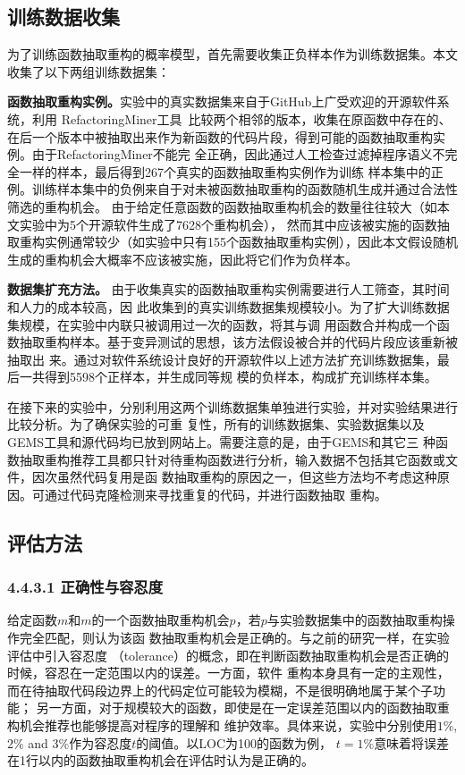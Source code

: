 \subsection{训练数据收集}
为了训练函数抽取重构的概率模型，首先需要收集正负样本作为训练数据集。本文收集了以下两组训练数据集：

\textbf{函数抽取重构实例。}实验中的真实数据集来自于GitHub上广受欢迎的开源软件系统，利用
RefactoringMiner工具~\cite{tsantalis2013multidimensional}比较两个相邻的版本，收集在原函数中存在的、
在后一个版本中被抽取出来作为新函数的代码片段，得到可能的函数抽取重构实例。由于RefactoringMiner不能完
全正确，因此通过人工检查过滤掉程序语义不完全一样的样本，最后得到267个真实的函数抽取重构实例作为训练
样本集中的正例。训练样本集中的负例来自于对未被函数抽取重构的函数随机生成并通过合法性筛选的重构机会。
由于给定任意函数的函数抽取重构机会的数量往往较大（如本文实验中为5个开源软件生成了7628个重构机会），
然而其中应该被实施的函数抽取重构实例通常较少（如实验中只有155个函数抽取重构实例），因此本文假设随机
生成的重构机会大概率不应该被实施，因此将它们作为负样本。

\textbf{数据集扩充方法。} 由于收集真实的函数抽取重构实例需要进行人工筛查，其时间和人力的成本较高，因
此收集到的真实训练数据集规模较小。为了扩大训练数据集规模，在实验中内联只被调用过一次的函数，将其与调
用函数合并构成一个函数抽取重构样本。基于变异测试的思想，该方法假设被合并的代码片段应该重新被抽取出
来。通过对软件系统设计良好的开源软件以上述方法扩充训练数据集，最后一共得到5598个正样本，并生成同等规
模的负样本，构成扩充训练样本集。
  
在接下来的实验中，分别利用这两个训练数据集单独进行实验，并对实验结果进行比较分析。为了确保实验的可重
复性，所有的训练数据集、实验数据集以及GEMS工具和源代码均已放到网站上。需要注意的是，由于GEMS和其它三
种函数抽取重构推荐工具都只针对待重构函数进行分析，输入数据不包括其它函数或文件，因次虽然代码复用是函
数抽取重构的原因之一，但这些方法均不考虑这种原因。可通过代码克隆检测来寻找重复的代码，并进行函数抽取
重构。

\subsection{评估方法}
\subsubsection{4.4.3.1 正确性与容忍度}\label{tol}
给定函数$m$和$m$的一个函数抽取重构机会$p$，若$p$与实验数据集中的函数抽取重构操作完全匹配，则认为该函
数抽取重构机会是正确的。与之前的研究一样\cite{charalampidou2016identifying}，在实验评估中引入容忍度
（tolerance）的概念，即在判断函数抽取重构机会是否正确的时候，容忍在一定范围以内的误差。一方面，软件
重构本身具有一定的主观性，而在待抽取代码段边界上的代码定位可能较为模糊，不是很明确地属于某个子功能；
另一方面，对于规模较大的函数，即使是在一定误差范围以内的函数抽取重构机会推荐也能够提高对程序的理解和
维护效率。具体来说，实验中分别使用$1\%$, $2\%$ and $3\%$作为容忍度$t$的阈值。以LOC为100的函数为例，
$t=1\%$意味着将误差在1行以内的函数抽取重构机会在评估时认为是正确的。

